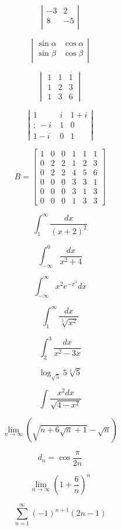 \documentclass[12pt]{article}
\begin{document}
$$
\left| \begin{array}{ccc}
-3 & 2 \\
8 & -5 \\
\end{array} \right|
$$

$$
\left| \begin{array}{ccc}
\sin\alpha & \cos\alpha \\
\sin\beta & \cos\beta \\
\end{array} \right|
$$

$$
\begin{vmatrix}
1 & 1 & 1 \\
1 & 2 & 3 \\
1 & 3 & 6
\end{vmatrix}
$$

$$
\left| \begin{array}{ccc}
1 & i & 1+i \\
;\ -i\ & 1 & 0 \\
1-i & 0 & 1
\end{array} \right|
$$

$$
B =\left[ \begin{array}{c|cc|ccc}
1 & 0 & 0 & 1 & 1 & 1 \\
\hline
0 & 2 & 2 & 1 & 2 & 3 \\
0 & 2 & 2 & 4 & 5 & 6 \\
\hline
0 & 0 & 0 & 3 & 3 & 1 \\
0 & 0 & 0 & 3 & 1 & 3 \\
0 & 0 & 0 & 1 & 3 & 3   
\end{array} \right]
$$


$$
\int^{\infty}_1 \frac{dx}{(x+2)^2}
$$

$$
\int^{0}_{-\infty} \frac{dx}{x^2+4}
$$

$$
\int^{\infty}_{-\infty} x^2 e^{-x^3}dx
$$

$$
\int^{\infty}_{1} \frac{dx}{\sqrt[5]{x^2}}
$$

$$
\int^{3}_{2} \frac{dx}{x^2-3x}
$$

$$
\log_{\sqrt{5}}5\sqrt[3]{5}
$$


$$
\int \frac{x^2dx}{\sqrt{4-x^2}}
$$

$$
\lim_{n\to\infty}\left( \sqrt{n+6\sqrt{n}+1} - \sqrt{n} \right)
$$

$$
d_n = \cos\frac{\pi}{2n}
$$

$$
\lim_{n\to\infty} \left ( 1+\frac{6}{n} \right )^n
$$

$$
\sum_{n=1}^{\infty} (-1)^{n+1}(2n-1)
$$
\end{document}
